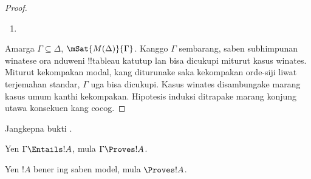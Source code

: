 \documentclass[../../../include/open-logic-section]{subfiles}
\begin{document}
\begin{proof}
\begin{enumerate}
{{      Yen $\sFmla{\False}{\indfrm}[\sigma] \in \Delta$, mula kanggo
      sawetara $\sigma.n$, $\sFmla{\False}{!B}[\sigma.n] \in \Delta$
      amarga cabange jangkep. Miturut hipotesis induksi,
      $\mSat/{M(\Delta)}{!B}[\sigma.n]$. Amarga $R\sigma(\sigma.n)$,
      ana~$\sigma'$ kang nyukupi
      $\mSat/{M(\Delta)}{!B}[\sigma']$. Dadi
      $\mSat/{M(\Delta)}{\indfrm}[\sigma]$.}}
  \item {}
\end{enumerate}
Amarga $\Gamma \subseteq \Delta$, $\mSat{M(\Delta)}{\Gamma}$.
Kanggo $\Gamma$ sembarang, saben subhimpunan winatese ora nduweni
!!{tableau} katutup lan bisa dicukupi miturut kasus winates. Miturut
kekompakan modal, kang diturunake saka kekompakan orde-siji liwat
terjemahan standar, $\Gamma$ uga bisa dicukupi.
Kasus winates disambungake marang kasus umum kanthi kekompakan. Hipotesis induksi ditrapake marang konjung utawa konsekuen kang cocog.
\end{proof}

\begin{prob}
Jangkepna bukti .
\end{prob}

\begin{cor}
Yen $\Gamma \Entails !A$, mula $\Gamma \Proves !A$.
\end{cor}

\begin{cor}
Yen $!A$ bener ing saben model, mula $\Proves !A$.
\end{cor}
\end{document}
